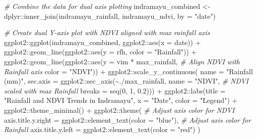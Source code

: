 \documentclass[
]{article}
\newenvironment{Shaded}{}{}
\newcommand{\AttributeTok}[1]{\textcolor[rgb]{0.49,0.56,0.16}{#1}}
\newcommand{\CommentTok}[1]{\textcolor[rgb]{0.38,0.63,0.69}{\textit{#1}}}
\newcommand{\DecValTok}[1]{\textcolor[rgb]{0.25,0.63,0.44}{#1}}
\newcommand{\FloatTok}[1]{\textcolor[rgb]{0.25,0.63,0.44}{#1}}
\newcommand{\FunctionTok}[1]{\textcolor[rgb]{0.02,0.16,0.49}{#1}}
\newcommand{\NormalTok}[1]{#1}
\newcommand{\OtherTok}[1]{\textcolor[rgb]{0.00,0.44,0.13}{#1}}
\newcommand{\SpecialCharTok}[1]{\textcolor[rgb]{0.25,0.44,0.63}{#1}}
\newcommand{\StringTok}[1]{\textcolor[rgb]{0.25,0.44,0.63}{#1}}
\begin{document}
\begin{Shaded}
\begin{Highlighting}[]
\CommentTok{\# Combine the data for dual axis plotting}
\NormalTok{indramayu\_combined }\OtherTok{\textless{}{-}}\NormalTok{ dplyr}\SpecialCharTok{::}\FunctionTok{inner\_join}\NormalTok{(indramayu\_rainfall, }
\NormalTok{                                        indramayu\_ndvi, }
                                        \AttributeTok{by =} \StringTok{"date"}\NormalTok{)}

\CommentTok{\# Create dual Y{-}axis plot with NDVI aligned with max rainfall axis}
\NormalTok{ggplot2}\SpecialCharTok{::}\FunctionTok{ggplot}\NormalTok{(indramayu\_combined, ggplot2}\SpecialCharTok{::}\FunctionTok{aes}\NormalTok{(}\AttributeTok{x =}\NormalTok{ date)) }\SpecialCharTok{+}
\NormalTok{  ggplot2}\SpecialCharTok{::}\FunctionTok{geom\_line}\NormalTok{(ggplot2}\SpecialCharTok{::}\FunctionTok{aes}\NormalTok{(}\AttributeTok{y =}\NormalTok{ rfh, }
                                  \AttributeTok{color =} \StringTok{"Rainfall"}\NormalTok{)) }\SpecialCharTok{+}
\NormalTok{  ggplot2}\SpecialCharTok{::}\FunctionTok{geom\_line}\NormalTok{(ggplot2}\SpecialCharTok{::}\FunctionTok{aes}\NormalTok{(}\AttributeTok{y =}\NormalTok{ vim }\SpecialCharTok{*}\NormalTok{ max\_rainfall, }
                                  \CommentTok{\# Align NDVI with Rainfall axis}
                                  \AttributeTok{color =} \StringTok{"NDVI"}\NormalTok{)) }\SpecialCharTok{+} 
\NormalTok{  ggplot2}\SpecialCharTok{::}\FunctionTok{scale\_y\_continuous}\NormalTok{(}
    \AttributeTok{name =} \StringTok{"Rainfall (mm)"}\NormalTok{, }
    \AttributeTok{sec.axis =}\NormalTok{ ggplot2}\SpecialCharTok{::}\FunctionTok{sec\_axis}\NormalTok{(}\SpecialCharTok{\textasciitilde{}}\NormalTok{.}\SpecialCharTok{/}\NormalTok{max\_rainfall, }
                                 \AttributeTok{name =} \StringTok{"NDVI"}\NormalTok{, }
                                 \CommentTok{\# NDVI scaled with max Rainfall}
                                 \AttributeTok{breaks =} \FunctionTok{seq}\NormalTok{(}\DecValTok{0}\NormalTok{, }\DecValTok{1}\NormalTok{, }\FloatTok{0.2}\NormalTok{))) }\SpecialCharTok{+}  
\NormalTok{  ggplot2}\SpecialCharTok{::}\FunctionTok{labs}\NormalTok{(}\AttributeTok{title =} \StringTok{"Rainfall and NDVI Trends in Indramayu"}\NormalTok{,}
       \AttributeTok{x =} \StringTok{"Date"}\NormalTok{,}
       \AttributeTok{color =} \StringTok{"Legend"}\NormalTok{) }\SpecialCharTok{+}
\NormalTok{  ggplot2}\SpecialCharTok{::}\FunctionTok{theme\_minimal}\NormalTok{() }\SpecialCharTok{+}
\NormalTok{  ggplot2}\SpecialCharTok{::}\FunctionTok{theme}\NormalTok{(}
    \CommentTok{\# Adjust axis color for NDVI}
    \AttributeTok{axis.title.y.right =}\NormalTok{ ggplot2}\SpecialCharTok{::}\FunctionTok{element\_text}\NormalTok{(}\AttributeTok{color =} \StringTok{"blue"}\NormalTok{), }
    \CommentTok{\# Adjust axis color for Rainfall}
    \AttributeTok{axis.title.y.left =}\NormalTok{ ggplot2}\SpecialCharTok{::}\FunctionTok{element\_text}\NormalTok{(}\AttributeTok{color =} \StringTok{"red"}\NormalTok{)    }
\NormalTok{  )}
\end{Highlighting}
\end{Shaded}
\end{document}
